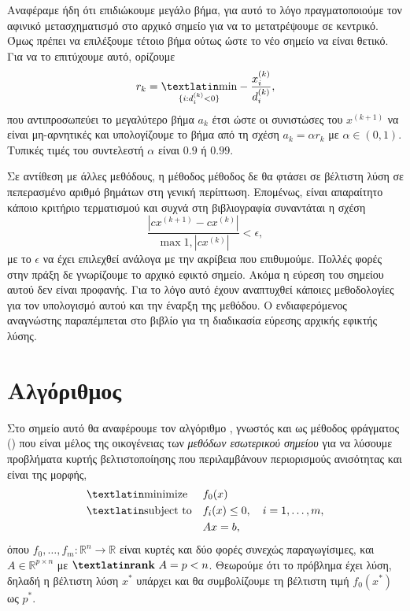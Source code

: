 Αναφέραμε ήδη ότι επιδιώκουμε μεγάλο βήμα, για αυτό το λόγο πραγματοποιούμε τον
αφινικό μετασχηματισμό στο αρχικό σημείο για να το μετατρέψουμε σε κεντρικό.
Όμως πρέπει να επιλέξουμε τέτοιο βήμα ούτως ώστε το νέο σημείο να είναι θετικό.
Για να το επιτύχουμε αυτό, ορίζουμε
\begin{equation*}
    r_k = \underset{\{i: d_i^{(k)} < 0\}} {\text{\tl{min}}}
    -\frac{x^{(k)}_i}{d^{(k)}_i},
\end{equation*}
που αντιπροσωπεύει το μεγαλύτερο βήμα \( a_k \) έτσι ώστε οι συνιστώσες του
\( x^{(k+1)} \) να είναι μη-αρνητικές και υπολογίζουμε το βήμα από τη σχέση
\( a_k = \alpha r_k \) με \( \alpha \in (0, 1) \). Τυπικές τιμές του συντελεστή
\( \alpha \) είναι \(0.9\) ή \(0.99\).

Σε αντίθεση με άλλες μεθόδους, η μέθοδος  μέθοδος δε θα
φτάσει σε βέλτιστη λύση σε πεπερασμένο αριθμό βημάτων στη γενική περίπτωση.
Επομένως, είναι απαραίτητο κάποιο κριτήριο τερματισμού και συχνά στη
βιβλιογραφία συναντάται η σχέση
\begin{equation*}
    \frac{ | cx^{(k+1)} - cx^{(k)} |} {\max{1, |cx^{(k)}|}} < \epsilon,
\end{equation*}
με το \( \epsilon \) να έχει επιλεχθεί ανάλογα με την ακρίβεια που επιθυμούμε.
Πολλές φορές στην πράξη δε γνωρίζουμε το αρχικό εφικτό σημείο. Ακόμα η εύρεση
του σημείου αυτού δεν είναι προφανής. Για το λόγο αυτό έχουν αναπτυχθεί κάποιες
μεθοδολογίες για τον υπολογισμό αυτού και την έναρξη της μεθόδου. Ο
ενδιαφερόμενος αναγνώστης παραπέμπεται στο βιβλίο \cite{chong2010} για τη
διαδικασία εύρεσης αρχικής εφικτής λύσης.

\section{Αλγόριθμος }
Στο σημείο αυτό θα αναφέρουμε τον αλγόριθμο , γνωστός και ως
μέθοδος φράγματος () που είναι μέλος της οικογένειας των
\emph{μεθόδων εσωτερικού σημείου} για να λύσουμε προβλήματα κυρτής βελτιστοποίησης
που περιλαμβάνουν περιορισμούς ανισότητας και είναι της μορφής,
\begin{equation}\label{eq:ip_min}
    \begin{aligned}
        & \text{\tl{minimize}}
        & & f_0(x) \\
        & \text{\tl{subject to}}
        & & f_i(x) \leq 0, \quad i = 1,\dots,m, \\
        &&& Ax = b,
    \end{aligned}
\end{equation}
όπου \( f_0, \dots, f_m : \mathbb{R}^n \to \mathbb{R} \) είναι κυρτές και δύο
φορές συνεχώς παραγωγίσιμες, και \( A \in \mathbb{R}^{p \times n} \) με
\( \textbf{\tl{rank}} \ A = p < n \). Θεωρούμε ότι το πρόβλημα έχει λύση, δηλαδή
η βέλτιστη λύση \( x^* \) υπάρχει και θα συμβολίζουμε τη βέλτιστη τιμή \(
f_0(x^*) \) ως \( p^* \).

